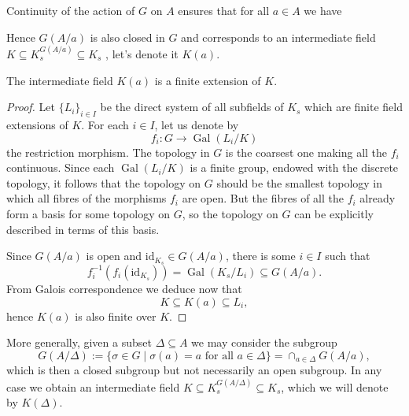 \documentclass[12pt]{amsart}
\DeclareMathOperator{\Gal}{Gal}
\newcommand{\id}{\mathrm{id}}
\begin{document}
Continuity of the action of $G$ on $A$ ensures that for all $a\in A$ we have
\begin{center}
\end{center}
Hence $G(A/a)$ is also closed in $G$ and corresponds to an intermediate field $K\subseteq K_{s}^{G(A/a)}\subseteq K_{s}$ \cite[4.2/3]{bos18}, let's denote it $K(a)$.

\begin{lm}\label{lm:intermediate}
    The intermediate field $K(a)$ is a finite extension of $K$.
    \begin{proof}
	Let $\{ L_{i} \}_{i\in I}$ be the direct system of all subfields of $K_{s}$ which are finite field extensions of $K$.
	For each $i\in I$, let us denote by
	\[ f_{i}\colon G\to \Gal(L_{i}/K) \]
	the restriction morphism.
	The topology in $G$ is the coarsest one making all the $f_{i}$ continuous.
	Since each $\Gal(L_{i}/K)$ is a finite group, endowed with the discrete topology, it follows that the topology on $G$ should be the smallest topology in which all fibres of the morphisms $f_{i}$ are open.
	But the fibres of all the $f_{i}$ already form a basis for some topology on $G$, so the topology on $G$ can be explicitly described in terms of this basis.

	Since $G(A/a)$ is open and $\id_{K_{s}}\in G(A/a)$, there is some $i\in I$ such that
	\[ f_{i}^{-1}(f_{i}(\id_{K_{s}}))=\Gal(K_{s}/L_{i})\subseteq G(A/a). \]
	From Galois correspondence we deduce now that
	\[ K\subseteq K(a)\subseteq L_{i}, \]
	hence $K(a)$ is also finite over $K$.
    \end{proof}
\end{lm}

More generally, given a subset $\Delta\subseteq A$ we may consider the subgroup
\[ G(A/\Delta):=\{\sigma\in G\mid \sigma(a)=a \text{ for all }a\in \Delta\}=\cap_{a\in \Delta}G(A/a), \]
which is then a closed subgroup but not necessarily an open subgroup.
In any case we obtain an intermediate field $K\subseteq K_{s}^{G(A/\Delta)}\subseteq K_{s}$, which we will denote by $K(\Delta)$.
\end{document}
